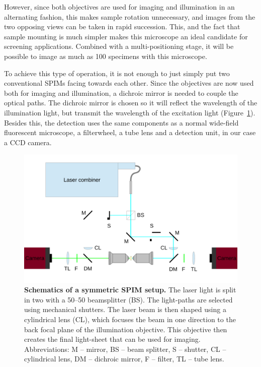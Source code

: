 \documentclass{tdk_style}
\begin{document}
However, since both objectives are used for imaging and illumination in an alternating fashion, this makes sample rotation unnecessary, and images from the two opposing views can be taken in rapid succession. This, and the fact that sample mounting is much simpler makes this microscope an ideal candidate for screening applications. Combined with a multi-positioning stage, it will be possible to image as much as 100 specimens with this microscope.

To achieve this type of operation, it is not enough to just simply put two conventional SPIMs facing towards each other. Since the objectives are now used both for imaging and illumination, a dichroic mirror is needed to couple the optical paths. The dichroic mirror is chosen so it will reflect the wavelength of the illumination light, but transmit the wavelength of the excitation light (Figure~\ref{fig:setup1}). Besides this, the detection uses the same components as a normal wide-field fluorescent microscope, a filterwheel, a tube lens and a detection unit, in our case a CCD camera.
\begin{figure}[htpd]
	\centering
		\centering
		\includegraphics[width=\textwidth]{figures/2_spim/setup1free}
	\caption{\textbf{Schematics of a symmetric SPIM setup.} The laser light is split in two with a 50--50 beamsplitter (BS). The light-paths are selected using mechanical shutters. The laser beam is then shaped using a cylindrical lens (CL), which focuses the beam in one direction to the back focal plane of the illumination objective. This objective then creates the final light-sheet that can be used for imaging. Abbreviations: M -- mirror, BS -- beam splitter, S -- shutter, CL -- cylindrical lens, DM -- dichroic mirror, F -- filter, TL -- tube lens.}
	\label{fig:setup1}
\end{figure}
\end{document}
